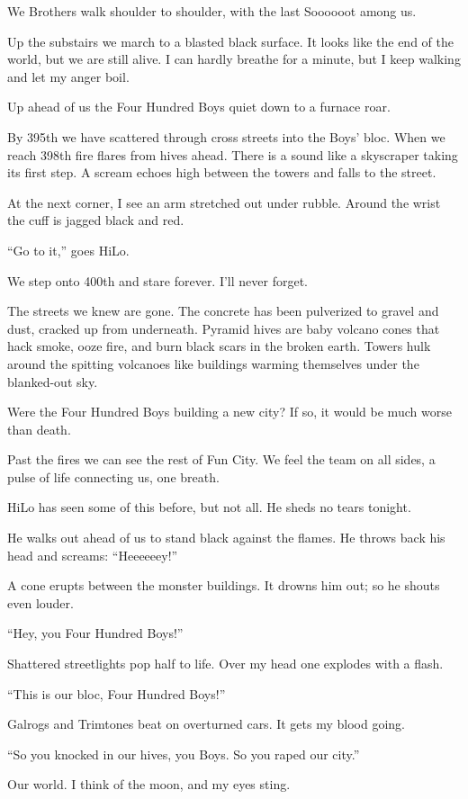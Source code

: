 We Brothers walk shoulder to shoulder, with the last Soooooot among us.

Up the substairs we march to a blasted black surface. It looks like the end of the world, but we are still alive. 
I can hardly breathe for a minute, but I keep walking and let my anger boil.

Up ahead of us the Four Hundred Boys quiet down to a furnace roar.

By 395th we have scattered through cross streets into the Boys' bloc.
When we reach 398th fire flares from hives ahead. There is a sound like a skyscraper taking its first step. A scream echoes high between the towers and falls to the street.

At the next corner, I see an arm stretched out under rubble. Around the wrist the cuff is jagged black and red.

“Go to it,” goes HiLo.

We step onto 400th and stare forever. I'll never forget.

The streets we knew are gone. The concrete has been pulverized to gravel and dust, cracked up from underneath. Pyramid hives are baby volcano cones that hack smoke, ooze fire, and burn black scars in the broken earth. Towers hulk around the spitting volcanoes like buildings warming themselves under the blanked-out sky.

Were the Four Hundred Boys building a new city? If so, it would be much worse than death.

Past the fires we can see the rest of Fun City. We feel the team on all sides, a pulse of life connecting us, one breath.

HiLo has seen some of this before, but not all. He sheds no tears tonight.

He walks out ahead of us to stand black against the flames. He throws back his head and screams: “Heeeeeey!”

A cone erupts between the monster buildings. It drowns him out; so he shouts even louder.

“Hey, you Four Hundred Boys!”

Shattered streetlights pop half to life. Over my head one explodes with a flash.

“This is our bloc, Four Hundred Boys!”

Galrogs and Trimtones beat on overturned cars. It gets my blood going.

“So you knocked in our hives, you Boys. So you raped our city.”

Our world. I think of the moon, and my eyes sting.


